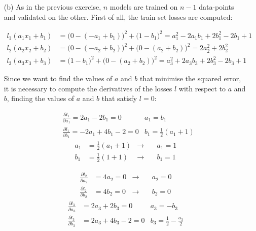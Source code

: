 {\begin{itemize}
		The final error is computed as the mean of the validation errors: 
		\begin{equation*}
			E=\frac{e_1+e_2+e_3}{3}=\bigg(\frac{1}{4}+1+\frac{1}{4}\bigg) 
			\frac{1}{3} = \frac{3}{2}\cdot \frac{1}{3}=\frac{1}{2}=0.5
		\end{equation*}
		
		\item[(b)] As in the previous exercise, $n$ models are trained on $n-1$ 
		data-points and validated on the other. First of all, the train set 
		losses are computed:
		
		\begin{align*}
		l_1(a_1x_1+b_1) & = \big(0-({-a_1+b_1})\big)^2 + 
		\big(1-b_1\big)^2  =  a_1^2 - 2 a_1 b_1 + 2 b_1^2 - 2 b_1 + 1  \\
		l_2(a_2x_2+b_2) & = \big(0-({-a_2+b_2})\big)^2 + 
		\big(0-({a_2+b_2})\big)^2 = 2 a_2^2 + 2 b_2^2 \\
		l_3(a_3x_3+b_3) & = \big(1-b_1\big)^2 + 
		\big(0-({a_2+b_2})\big)^2 = a_3^2 + 2 a_3 b_3 + 2 b_3^2 - 2 b_3 + 1
		\end{align*}
		
		Since we want to find the values of $a$ and $b$ that minimise the 
		squared error, it is necessary to compute the derivatives of the losses 
		$l$ with respect to $a$ and $b$, finding the values of $a$ and $b$ that 
		satisfy $l=0$:
		
		\begin{align*}
		&\frac{\partial l_1}{\partial a_1} = 2 a_1 - 2 b_1 = 0  
		& a_1 = b_1 \\
		&\frac{\partial l_1}{\partial b_1} = -2 a_1 + 4 b_1 - 2 = 0  
		& b_1 = \frac{1}{2} (a_1 + 1)
		\end{align*}
		\begin{align*}
		a_1 &= \frac{1}{2} (a_1 + 1)  &\rightarrow &\quad a_1 = 1\\
		b_1 &= \frac{1}{2} (1 + 1)  &\rightarrow& \quad b_1 = 1
		\end{align*}
		
		\begin{align*}
		\frac{\partial l_2}{\partial a_2} & = 4 a_2 = 0  
		&\rightarrow &\quad a_2 = 0  \\
		\frac{\partial l_2}{\partial b_2} & = 4 b_2 = 0  
		&\rightarrow &\quad b_2 = 0
		\end{align*}
		\begin{align*}
		\frac{\partial l_3}{\partial a_3} & = 2a_3+2b_3= 0  
		& a_3 = -b_3 \\
		\frac{\partial l_3}{\partial b_3} & = 2 a_3 + 4 b_3 - 2 = 0  
		& b_3 = \frac{1}{2} - \frac{a_3}{2}
		\end{align*}
		

\end{itemize}}
